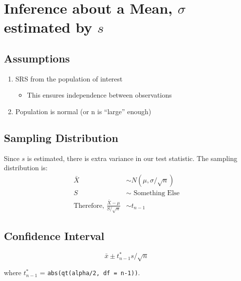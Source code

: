 \documentclass[
  letterpaper,
  DIV=11,
  numbers=noendperiod]{scrreprt}
\providecommand{\tightlist}{%
  \setlength{\itemsep}{0pt}\setlength{\parskip}{0pt}}\usepackage{longtable,booktabs,array}
\begin{document}
\hypertarget{inference-about-a-mean-sigma-estimated-by-s}{%
\section{\texorpdfstring{Inference about a Mean, \(\sigma\) estimated by
\(s\)}{Inference about a Mean, \textbackslash sigma estimated by s}}\label{inference-about-a-mean-sigma-estimated-by-s}}

\hypertarget{assumptions-3}{%
\subsection{Assumptions}\label{assumptions-3}}

\begin{enumerate}
\def\labelenumi{\arabic{enumi}.}
\tightlist
\item
  SRS from the population of interest

  \begin{itemize}
  \tightlist
  \item
    This ensures independence between observations
  \end{itemize}
\item
  Population is normal (or n is ``large'' enough)
\end{enumerate}

\hypertarget{sampling-distribution-1}{%
\subsection{Sampling Distribution}\label{sampling-distribution-1}}

Since \(s\) is estimated, there is extra variance in our test statistic.
The sampling distribution is: \begin{align*}
\bar X &\sim N(\mu, \sigma/\sqrt{n})\\
S &\sim \text{ Something Else}\\
\text{Therefore, } \frac{\bar X - \mu}{S/\sqrt n} &\sim t_{n-1}
\end{align*}

\hypertarget{confidence-interval-1}{%
\subsection{Confidence Interval}\label{confidence-interval-1}}

\[
\bar x \pm t_{n-1}^*s/\sqrt{n}
\]

where \(t_{n-1}^*\) = \texttt{abs(qt(alpha/2,\ df\ =\ n-1))}.
\end{document}
